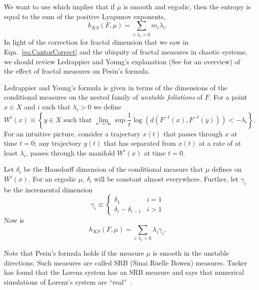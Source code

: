 We want to use \cite{pesin77} which implies
that if $\mu$ is smooth and ergodic, then the entropy is equal to the
sum of the positive Lyapunov exponents, \ie
\begin{equation}
  \label{eq:pesin}
  h_{KS}(F,\mu) = \sum_{i:\lambda_i >0} m_i \lambda_i.
\end{equation}
In light of the correction for fractal dimension that we saw in
Eqn.~\eqref{eq:CantorCorrect} and the ubiquity of fractal measures in
chaotic systems, we should review Ledrappier and Young's explanation
(See \cite{young95-1} for an overview) of the effect of fractal
measures on Pesin's formula.

Ledrappier and Young's formula is given in terms of the dimensions of
the conditional measures on the nested family of \emph{unstable
  foliations} of $F$.  For a point $x\in X$ and $i$ such that
$\lambda_i>0$ we define
\begin{equation}
  \label{eq:Foliation}
  W^i(x) \equiv \left\{ y \in X \text{ such that } \lim_{n \rightarrow
  \infty} \sup \frac{1}{t} \log \left( d\left( F^{-t}(x), F^{-t}(y)
  \right) \right) <
  -\lambda_i \right\}.
\end{equation}
For an intuitive picture, consider a trajectory $x(t)$ that passes
through $x$ at time $t=0$; any trajectory $y(t)$ that has separated
from $x(t)$ at a rate of at least $\lambda_i$, passes through the
manifold $W^i(x)$ at time $t=0$.

Let $\delta_i$ be the Hausdorff dimension of the conditional measure
that $\mu$ defines on $W^i(x)$.  For an ergodic $\mu$, $\delta_i$ will
be constant almost everywhere.  Further, let $\gamma_i$ be the
incremental dimension
\begin{equation*}
  \gamma_i \equiv
  \begin{cases}
    \delta_1 & i=1\\
    \delta_i - \delta_{i-1} & i > 1
  \end{cases}
\end{equation*}
Now  is
\begin{equation}
  \label{eq:Ledrappier}
  h_{KS}(F,\mu) = \sum_{i : \lambda_i > 0} \lambda_i \gamma_i.
\end{equation}

Note that Pesin's formula holds if the measure $\mu$ is smooth in the
unstable directions.  Such measures are called SRB (Sinai Ruelle
Bowen) measures.   Tucker has found that the Lorenz
system has an SRB measure and says that numerical simulations of
Lorenz's system are ``real''~\cite{tucker99}.

